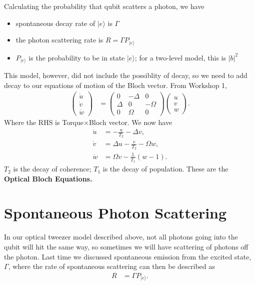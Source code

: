 \documentclass[lasers.tex]{subfiles}
\begin{document}
Calculating the probability that qubit scatters a photon, we have
\begin{itemize}
    \item spontaneous decay rate of $|e\rangle$ is $\Gamma$
    \item the photon scattering rate is $R=\Gamma P_{|e\rangle}$
    \item $P_{|e\rangle}$ is the probability to be in state $|e\rangle$; for a two-level model, this is $|b|^2$
\end{itemize}
This model, however, did not include the possiblity of decay, so we need to add decay to our equations of motion of the Bloch vector.
From Workshop 1,
\begin{align}
    \begin{pmatrix} \dot u \\ \dot v \\ \dot w \end{pmatrix} &= \begin{pmatrix} 0 &-\Delta &0\\ \Delta & 0 & -\Omega \\ 0 & \Omega & 0 \end{pmatrix}\begin{pmatrix}u \\ v \\ w\end{pmatrix}.
\end{align}
Where the RHS is Torque$\times$Bloch vector. 
We now have
\begin{align}
    \dot{u} &= -\frac{u}{T_2} - \Delta v, \\
    \dot{v} &= \Delta u - \frac{v}{T_2} - \Omega w, \\
    \dot{w} &= \Omega v - \frac{1}{T_1}(w-1).
\end{align}
$T_2$ is the decay of coherence; $T_1$ is the decay of population. 
These are the \textbf{Optical Bloch Equations.}

\chapter{Spontaneous Photon Scattering}
In our optical tweezer model described above, not all photons going into the qubit will hit the same way, so sometimes we will have scattering of photons off the photon. 
Last time we discussed spontaneous emission from the excited state, $\Gamma$, where the rate of spontaneous scattering can then be described as
\begin{align}
    R &= \Gamma P_{|e\rangle}.
\end{align}
\end{document}
